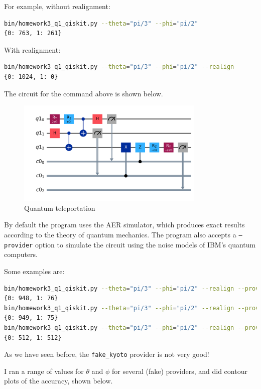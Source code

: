 \documentclass[12pt]{extarticle}
\begin{document}
\begin{enumerate}[(a)]
For example, without realignment:
\begin{lstlisting}[language=bash]
bin/homework3_q1_qiskit.py --theta="pi/3" --phi="pi/2"
{0: 763, 1: 261}
\end{lstlisting}
With realignment:
\begin{lstlisting}[language=bash]
bin/homework3_q1_qiskit.py --theta="pi/3" --phi="pi/2" --realign
{0: 1024, 1: 0}
\end{lstlisting}

The circuit for the command above is shown below.
\begin{figure}[H]
\centering
\includegraphics[width=0.80\textwidth]{images/homework3_q1_2pi3_pi2_aer.png}
\caption{Quantum teleportation}
\end{figure}

By default the program uses the AER simulator, which produces exact results according to the theory of quantum mechanics.
The program also accepts a \texttt{---provider} option to simulate the circuit using the noise models of IBM's quantum computers.

Some examples are:
\begin{lstlisting}[language=bash,basicstyle=\tiny]
bin/homework3_q1_qiskit.py --theta="pi/3" --phi="pi/2" --realign --provider=fake_sherbrooke
{0: 948, 1: 76}
bin/homework3_q1_qiskit.py --theta="pi/3" --phi="pi/2" --realign --provider=fake_osaka
{0: 949, 1: 75}
bin/homework3_q1_qiskit.py --theta="pi/3" --phi="pi/2" --realign --provider=fake_kyoto
{0: 512, 1: 512}
\end{lstlisting}
As we have seen before, the \texttt{fake\_kyoto} provider is not very good!
\end{enumerate}

I ran a range of values for $\theta$ and $\phi$ for several (fake) providers, and did contour plots of the accuracy,
shown below.
\end{document}
